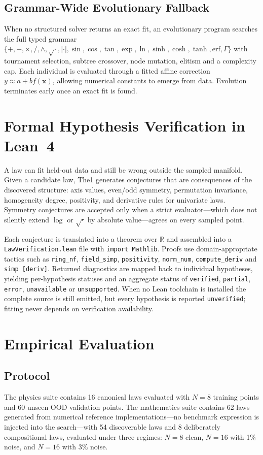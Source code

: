 \documentclass[10pt,journal,compsoc]{IEEEtran}
\begin{document}
\subsection{Grammar-Wide Evolutionary Fallback}
When no structured solver returns an exact fit, an evolutionary program searches the full typed grammar $\{+,-,\times,/,\wedge,\sqrt{\cdot},|\cdot|,\sin,\cos,\tan,\exp,\ln,\allowbreak \sinh,\cosh,\tanh,\mathrm{erf},\Gamma\}$ with tournament selection, subtree crossover, node mutation, elitism and a complexity cap. Each individual is evaluated through a fitted affine correction $y \approx a + b f(\mathbf{x})$, allowing numerical constants to emerge from data. Evolution terminates early once an exact fit is found.

\section{Formal Hypothesis Verification in Lean~4}
A law can fit held-out data and still be wrong outside the sampled manifold. Given a candidate law, The1 generates conjectures that are consequences of the discovered structure: axis values, even/odd symmetry, permutation invariance, homogeneity degree, positivity, and derivative rules for univariate laws. Symmetry conjectures are accepted only when a strict evaluator---which does not silently extend $\log$ or $\sqrt{\cdot}$ by absolute value---agrees on every sampled point.

Each conjecture is translated into a theorem over $\mathbb{R}$ and assembled into a \texttt{LawVerification.lean} file with \texttt{import Mathlib}. Proofs use domain-appropriate tactics such as \texttt{ring\_nf}, \texttt{field\_simp}, \texttt{positivity}, \texttt{norm\_num}, \texttt{compute\_deriv} and \texttt{simp [deriv]}. Returned diagnostics are mapped back to individual hypotheses, yielding per-hypothesis statuses and an aggregate status of \texttt{verified}, \texttt{partial}, \texttt{error}, \texttt{unavailable} or \texttt{unsupported}. When no Lean toolchain is installed the complete source is still emitted, but every hypothesis is reported \texttt{unverified}; fitting never depends on verification availability.

\section{Empirical Evaluation}
\subsection{Protocol}
The physics suite contains 16 canonical laws evaluated with $N=8$ training points and 60 unseen OOD validation points. The mathematics suite contains 62 laws generated from numerical reference implementations---no benchmark expression is injected into the search---with 54 discoverable laws and 8 deliberately compositional laws, evaluated under three regimes: $N=8$ clean, $N=16$ with 1\% noise, and $N=16$ with 3\% noise.
\end{document}
